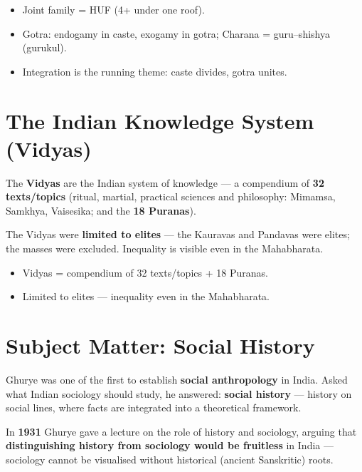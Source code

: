 \begin{QuickRevision}
\begin{itemize}
\item Joint family = HUF (4+ under one roof).
\item Gotra: endogamy in caste, exogamy in gotra; Charana = guru--shishya (gurukul).
\item Integration is the running theme: caste divides, gotra unites.
\end{itemize}
\end{QuickRevision}

\section{The Indian Knowledge System (Vidyas)}

\begin{KeyConcept}
The \textbf{Vidyas} are the Indian system of knowledge --- a compendium of \textbf{32 texts/topics} (ritual, martial, practical sciences and philosophy: Mimamsa, Samkhya, Vaisesika; and the \textbf{18 Puranas}).
\end{KeyConcept}

\begin{CriticalPoint}
The Vidyas were \textbf{limited to elites} --- the Kauravas and Pandavas were elites; the masses were excluded. Inequality is visible even in the Mahabharata.
\end{CriticalPoint}

\begin{QuickRevision}
\begin{itemize}
\item Vidyas = compendium of 32 texts/topics + 18 Puranas.
\item Limited to elites --- inequality even in the Mahabharata.
\end{itemize}
\end{QuickRevision}

\section{Subject Matter: Social History}

Ghurye was one of the first to establish \textbf{social anthropology} in India. Asked what Indian sociology should study, he answered: \textbf{social history} --- history on social lines, where facts are integrated into a theoretical framework.

\begin{DataFact}
In \textbf{1931} Ghurye gave a lecture on the role of history and sociology, arguing that \textbf{distinguishing history from sociology would be fruitless} in India --- sociology cannot be visualised without historical (ancient Sanskritic) roots.
\end{DataFact}


